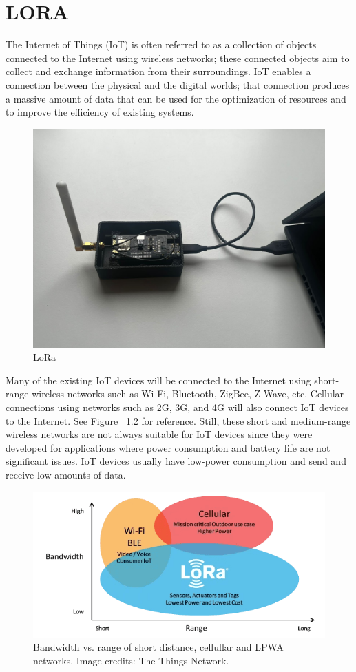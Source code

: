 \chapter{LORA}

The Internet of Things (IoT) is often referred to as a collection of objects connected to the Internet using wireless networks; these connected objects aim to collect and exchange information from their surroundings. IoT enables a connection between the physical and the digital worlds; that connection produces a massive amount of data that can be used for the optimization of resources and to improve the efficiency of existing systems. 
\newline

\begin{figure}
	\begin{center}
		\includegraphics[width=0.7\linewidth]{Images/LORA/LORA1.jpg}
		\caption{LoRa}
		\label{LoRAWANRange} 
	\end{center}
\end{figure}

Many of the existing IoT devices will be connected to the Internet using short-range wireless networks such as Wi-Fi, Bluetooth, ZigBee, Z-Wave, etc. Cellular connections using networks such as 2G, 3G, and 4G will also connect IoT devices to the Internet. See Figure ~\ref{LoRAWANRange} for reference. Still, these short and medium-range wireless networks are not always suitable for IoT devices since they were developed for applications where power consumption and battery life are not significant issues. IoT devices usually have low-power consumption and send and receive low amounts of data.
\cite{ArduinoLoRaWAN101:2024}

\begin{figure}
	\begin{center}
		\includegraphics[width=0.7\linewidth]{Images/LORA/LoRAwanRange.png}
		\caption{Bandwidth vs. range of short distance, cellullar and LPWA networks. Image credits: The Things Network.}
		\label{LoRAWANRange} 
	\end{center}
\end{figure}

